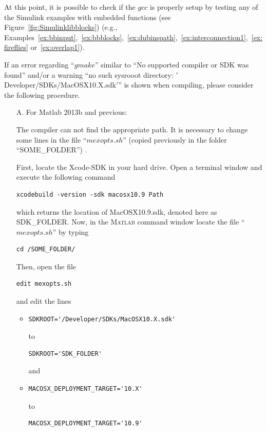 \documentclass{article}
\newcommand{\matlab}{\textsc{Matlab}}
\begin{document}
At this point, it is possible to check if the $gcc$ is properly setup by 
testing any of the Simulink examples with embedded functions 
(see Figure~\ref{fig:Simulinklibblocks}) (e.g., 
Examples~\ref{ex:bbinput},~\ref{ex:bbblocks},~\ref{ex:dubinspath},~\ref{ex:interconnection1},~\ref{ex:fireflies} or~\ref{ex:overlap1}).

If an error regarding ``$gmake$'' similar to ``No supported compiler or SDK was found'' 
and/or a warning ``no such sysrooot directory: 
$'$Developer/SDKs/MacOSX10.X.sdk$'$'' is shown when compiling, 
please consider the following procedure.

\begin{itemize}
\item[A.] For Matlab 2013b and previous:

The compiler can not find the appropriate path. It is necessary to change some lines in the 
file ``$mexopts.sh$'' (copied previously in the folder ``SOME\_FOLDER'') .

First, locate the Xcode-SDK in your hard drive. 
Open a terminal window and execute the following command
\begin{verbatim}
xcodebuild -version -sdk macosx10.9 Path
\end{verbatim}
which returns the location of MacOSX10.9.sdk, denoted here as SDK\_FOLDER. 
Now, in the \matlab{} command window locate the file ``$mexopts.sh$'' by typing 
\begin{verbatim}
cd /SOME_FOLDER/
\end{verbatim}
Then, open the file 
\begin{verbatim}
edit mexopts.sh
\end{verbatim}
and edit the lines
\begin{itemize}
\item
\begin{verbatim}
SDKROOT='/Developer/SDKs/MacOSX10.X.sdk'
\end{verbatim}
to 
\begin{verbatim}
SDKROOT='SDK_FOLDER'
\end{verbatim}
and
\item
\begin{verbatim}
MACOSX_DEPLOYMENT_TARGET='10.X'
\end{verbatim}
to 
\begin{verbatim}
MACOSX_DEPLOYMENT_TARGET='10.9'
\end{verbatim}
\end{itemize}


\end{itemize}
\end{document}
